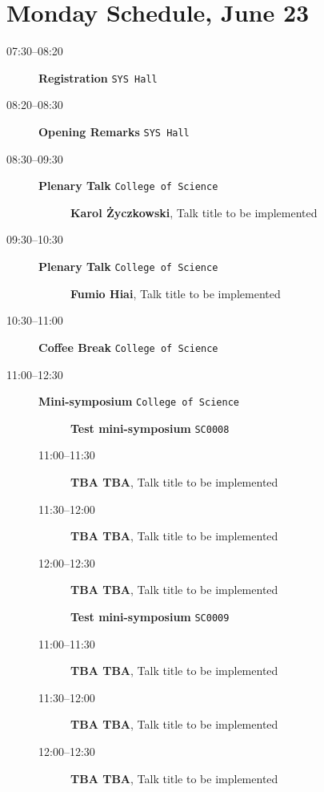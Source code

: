\documentclass[ILAS2025-program.tex]{subfiles}
\begin{document}
\section{Monday Schedule, June 23}
    
    \begin{description}
    \item[07:30--08:20] \textbf{Registration} {\footnotesize\texttt{SYS Hall}}
    \item[08:20--08:30] \textbf{Opening Remarks} {\footnotesize\texttt{SYS Hall}}
    \item[08:30--09:30] \textbf{Plenary Talk} {\footnotesize\texttt{College of Science}}
    \begin{description}
        \item[] \textbf{Karol Życzkowski}, Talk title to be implemented
        \end{description}
        \item[09:30--10:30] \textbf{Plenary Talk} {\footnotesize\texttt{College of Science}}
    \begin{description}
        \item[] \textbf{Fumio Hiai}, Talk title to be implemented
        \end{description}
        \item[10:30--11:00] \textbf{Coffee Break} {\footnotesize\texttt{College of Science}}
    \item[11:00--12:30] \textbf{Mini-symposium} {\footnotesize\texttt{College of Science}}
    \begin{description}
    \item[] \textbf{Test mini-symposium} {\footnotesize\texttt{SC0008}}
    \item[11:00--11:30] \textbf{TBA TBA}, Talk title to be implemented
        \item[11:30--12:00] \textbf{TBA TBA}, Talk title to be implemented
        \item[12:00--12:30] \textbf{TBA TBA}, Talk title to be implemented
        \end{description}
    \begin{description}
    \item[] \textbf{Test mini-symposium} {\footnotesize\texttt{SC0009}}
    \item[11:00--11:30] \textbf{TBA TBA}, Talk title to be implemented
        \item[11:30--12:00] \textbf{TBA TBA}, Talk title to be implemented
        \item[12:00--12:30] \textbf{TBA TBA}, Talk title to be implemented

\end{description}
\end{description}
\end{document}
